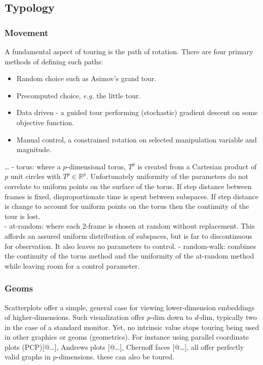 \documentclass{monashthesis}
\begin{document}
\subsection{Typology}\label{typology}

\subsubsection{Movement}\label{movement}

A fundamental aspect of touring is the path of rotation. There are four
primary methods of defining such
paths\autocite{buja_computational_2005}:

\begin{itemize}
\tightlist
\item
  Random choice such as Asimov's grand tour\autocite{asimov_grand_1985}.
\item
  Precomputed choice, \emph{e.g.} the little
  tour\autocite{mcdonald_interactive_1982}.
\item
  Data driven - a guided tour performing (stochastic) gradient descent
  on some objective function\autocite{hurley_analyzing_1990}.
\item
  Manual control, a constrained rotation on selected manipulation
  variable and magnitude\autocite{cook_manual_1997}.
\end{itemize}

\ldots{} - torus: where a \(p\)-dimensional torus, \(T^p\) is created
from a Cartesian product of \(p\) unit circles with
\(T^p \in \mathbb{R}^p\). Unfortunately uniformity of the parameters do
not correlate to uniform points on the surface of the torus. If step
distance between frames is fixed, disproportionate time is spent between
subspaces. If step distance is change to account for uniform points on
the torus then the continuity of the tour is lost.\\
- at-random: where each 2-frame is chosen at random without replacement.
This affords an assured uniform distribution of subspaces, but is far to
discontinuous for observation. It also leaves no parameters to control.
- random-walk: combines the continuity of the torus method and the
uniformity of the at-random method while leaving room for a control
parameter.

\subsubsection{Geoms}\label{geoms}

Scatterplots offer a simple, general case for viewing lower-dimension
embeddings of higher-dimensions. Such visualization offer \(p\)-dim down
to \(d\)-dim, typically two in the case of a standard monitor. Yet, no
intrinsic value stops touring being used in other graphics or geoms
(geometrics). For instance using parallel coordinate plots
(PCP){[}@\ldots{}{]}, Andrews plots {[}@\ldots{}{]}, Chernoff faces
{[}@\ldots{}{]}, all offer perfectly valid graphs in \(p\)-dimensions.
these can also be toured.
\end{document}
